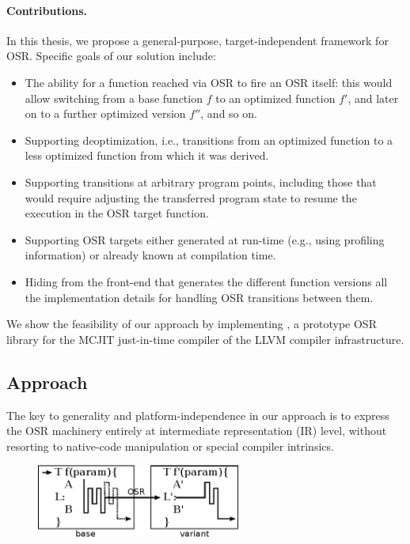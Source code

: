 \paragraph*{Contributions.} In this thesis, we propose a general-purpose, target-independent framework for OSR. Specific goals of our solution include:
\begin{itemize}[parsep=0pt]
\item The ability for a function reached via OSR to fire an OSR itself: this would allow switching from a base function $f$ to an optimized function $f'$, and later on to a further optimized version $f''$, and so on.
\item Supporting deoptimization, i.e., transitions from an optimized function to a less optimized function from which it was derived.
\item Supporting transitions at arbitrary program points, including those that would require adjusting the transferred program state to resume the execution in the OSR target function.
\item Supporting OSR targets either generated at run-time (e.g., using profiling information) or already known at compilation time.
\item Hiding from the front-end that generates the different function versions all the implementation details for handling OSR transitions between them.%
\end{itemize}

\noindent We show the feasibility of our approach by implementing \osrkit, a prototype OSR library for the MCJIT just-in-time compiler of the LLVM compiler infrastructure.

\subsection{Approach}
\label{ss:osr-llvm-approach}

The key to generality and platform-independence in our approach is to express the OSR machinery entirely at intermediate representation (IR) level, without resorting to native-code manipulation or special compiler intrinsics.

\ifdefined\noauthorea
\begin{figure}[hb]
\vspace{4mm} %
\begin{center}
\includegraphics[width=0.6\textwidth]{figures/osr-dynamics/osr-dynamics.eps}
\caption{\protect}
\end{center}
\end{figure}
\fi

